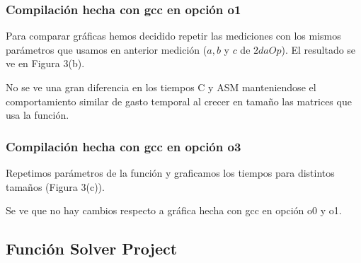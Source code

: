 \subsubsection{Compilación hecha con gcc en opción o1}
Para comparar gráficas hemos decidido repetir las mediciones con los mismos parámetros que usamos en anterior medición ($a, b$ y $c$ de $2daOp$). El resultado se ve en Figura 3(b).

  
No se ve una gran diferencia en los tiempos C y ASM manteniendose el comportamiento similar de gasto temporal al crecer en tamaño las matrices que usa la función.
  
\subsubsection{Compilación hecha con gcc en opción o3}
Repetimos parámetros de la función y graficamos los tiempos para distintos tamaños (Figura 3(c)).

  
Se ve que no hay cambios respecto a gráfica hecha con gcc en opción o0 y o1. 

\subsection{Función Solver Project}

